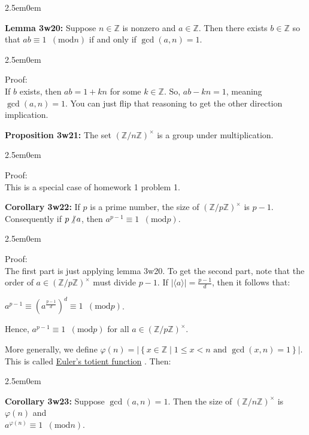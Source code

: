 \documentclass{book}
\newcommand{\hTwo}{%
\color{MidnightBlue}%
   \fontsize{13}{15}\selectfont%
}
\newcommand{\hThree}{%
   \color{PineGreen!85!Orange}
   \fontsize{12}{14}\selectfont%
}
\newenvironment{myIndent}{%
   \begin{adjustwidth}{2.5em}{0em}%
}{%
   \end{adjustwidth}%
}
\newcommand{\udefine}[1]{{%
   \setulcolor{Red}%
   \setul{0.14em}{0.07em}%
   \ul{#1}%
}}
\newcommand{\blab}[1]{\textbf{#1}}
\newcommand{\mMod}[1]{\phantom{a}(\mathrel{\mathrm{mod}} #1)}
\newcommand{\divides}{\mathop{\mid}}
\newcommand{\retTwo}{\hfill\bigbreak}
\begin{document}
{\begin{myIndent}\hTwo
	\blab{Lemma 3w20:} Suppose $n \in \mathbb{Z}$ is nonzero and $a \in \mathbb{Z}$. Then there exists $b \in \mathbb{Z}$ so that $ab \equiv 1 \mMod{n}$ if and only if $\gcd(a, n) = 1$.
	
	\begin{myIndent}\hThree
		Proof:\\
		If $b$ exists, then $ab = 1 + kn$ for some $k \in \mathbb{Z}$. So, $ab - kn = 1$, meaning\\ $\gcd(a, n) = 1$. You can just flip that reasoning to get the other direction\\ implication.\retTwo
	\end{myIndent}

	\blab{Proposition 3w21:} The set $(\mathbb{Z}/n\mathbb{Z})^\times$ is a group under multiplication.

	\begin{myIndent}\hThree
		Proof:\\
		This is a special case of homework 1 problem 1.\newpage
	\end{myIndent}

	\blab{Corollary 3w22:} If $p$ is a prime number, the size of $(\mathbb{Z}/p\mathbb{Z})^\times$ is $p - 1$. Consequently if $p \hspace{-0.1em}\not\divides a$, then $a^{p-1} \equiv 1 \mMod{p}$.

	\begin{myIndent}\hThree
		Proof:\\
		The first part is just applying lemma 3w20. To get the second part, note that the order of $a \in (\mathbb{Z} / p\mathbb{Z})^\times$ must divide $p - 1$. If $|\langle a \rangle| = \frac{p - 1}{d}$, then it follows that:
		
		{\centering $a^{p-1} \equiv (a^{\frac{p - 1}{d}})^d \equiv 1 \mMod{p}$.\retTwo\par}

		Hence, $a^{p-1} \equiv 1 \mMod{p}$ for all $a \in (\mathbb{Z}/p\mathbb{Z})^{\times}$.\retTwo
	\end{myIndent}
\end{myIndent}}

More generally, we define $\varphi(n) = |\left\{x \in \mathbb{Z} \mid 1 \leq x < n \text{ and } \gcd(x, n) = 1\right\}|$. This is called \udefine{Euler's totient function}. Then:

\begin{myIndent}\hTwo
	\blab{Corollary 3w23:} Suppose $\gcd(a, n) = 1$. Then the size of $(\mathbb{Z}/n\mathbb{Z})^\times$ is $\varphi(n)$ and\\ $a^{\varphi(n)} \equiv 1 \mMod{n}$.\retTwo
\end{myIndent}
\end{document}
